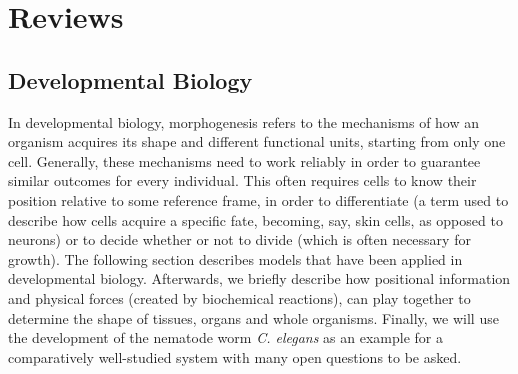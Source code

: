 \documentclass[fleqn,10pt]{wlscirep}
\begin{document}
\section*{Reviews}


% 
%
\subsection*{Developmental Biology}

In developmental biology, morphogenesis refers to the mechanisms of how an organism acquires its shape and different functional units, starting from only one cell. Generally, these mechanisms need to work reliably in order to guarantee similar outcomes for every individual. This often requires cells to know their position relative to some reference frame, in order to differentiate (a term used to describe how cells acquire a specific fate, becoming, say, skin cells, as opposed to neurons) or to decide whether or not to divide (which is often necessary for growth). The following section describes models that have been applied in developmental biology.
Afterwards, we briefly describe how positional information and physical forces (created by biochemical reactions), can play together to determine the shape of tissues, organs and whole organisms. Finally, we will use the development of the nematode worm \textit{C. elegans} as an example for a comparatively well-studied system with many open questions to be asked.
\end{document}
